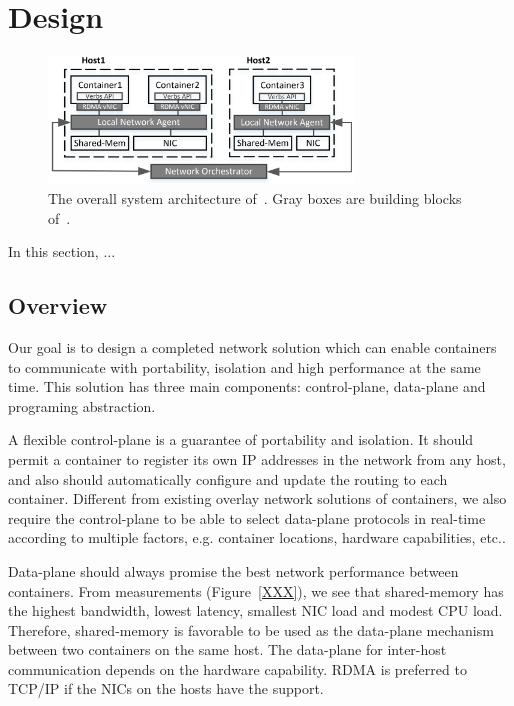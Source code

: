 \section{Design} \label{sec:design}

\begin{figure}[t!] 
     \centering 
     \includegraphics[width=3.2in]{figures/system-arch.png} 
    \caption{\label{fig:sysarch} The overall system architecture of~\sysname. Gray boxes are building blocks of~\sysname.} 
\end{figure} 

In this section, ...

\subsection{Overview}

Our goal is to design a completed network solution which can enable containers
to communicate with portability, isolation and high performance at the same time.
This solution has three main components: control-plane, data-plane and programing
abstraction. 

A flexible control-plane is a guarantee of portability and isolation. 
It should permit a container to register its own IP addresses in the network
from any host, and also should automatically configure and update the routing 
to each container. Different from existing overlay network solutions of 
containers, we also require the control-plane to be able to select 
data-plane protocols in real-time according to multiple factors, 
e.g. container locations, hardware capabilities, etc..

Data-plane should always promise the best network performance between 
containers. From measurements (Figure~\ref{XXX}), 
we see that shared-memory has the highest
bandwidth, lowest latency, smallest NIC load and modest CPU load. 
Therefore, shared-memory is favorable to be used as the data-plane 
mechanism between two containers on the same host. 
The data-plane for inter-host communication
depends on the hardware capability. RDMA is preferred to TCP/IP if the NICs
on the hosts have the support.


